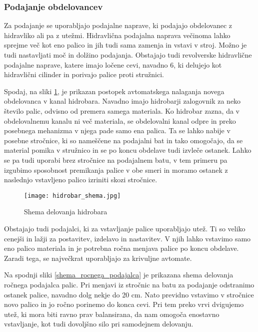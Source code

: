 \subsubsection{Podajanje obdelovancev}
Za podajanje se uporabljajo podajalne naprave, ki podajajo
obdelovanec z hidravliko ali pa z utežmi. Hidravlična podajalna
naprava večinoma lahko sprejme več kot eno palico in jih tudi sama
zamenja in vstavi v stroj. Možno je tudi nastavljati moč in dolžino
podajanja. Obstajajo tudi revolverske hidravlične podajalne naprave,
katere imajo ločene cevi, navadno 6, ki delujejo kot hidravlični cilinder
in porivajo palice proti stružnici.

Spodaj, na sliki \ref{hidrobar_nalaganje}, je prikazan postopek
avtomatskega nalaganja novega obdelovanca v kanal hidrobara.
Navadno imajo hidrobarji zalogovnik za neko število palic, odvisno
od premera samega materiala. Ko hidrobar zazna, da v obdelovalnemu
kanalu ni več materiala, se obdelovalni kanal odpre in preko posebnega
mehanizma v njega pade samo ena palica. Ta se lahko nabije v posebne
stročnice, ki so nameščene na podajalni bat in tako omogočajo, da se
material pomika v stružnico in se po koncu obdelave tudi izvleče ostanek.
Lahko se pa tudi uporabi brez stročnice na podajalnem batu, v tem primeru
pa izgubimo sposobnost premikanja palice v obe smeri in moramo ostanek z
naslednjo vstavljeno palico izriniti skozi stročnice.
\begin{figure}[H]
	\begin{center}
		\texttt{[image: hidrobar\_shema.jpg]}
		\caption{Shema delovanja hidrobara
			\cite{interna}}
		\label{hidrobar_nalaganje}
	\end{center}
\end{figure}



Obstajajo tudi podajalci, ki za vstavljanje palice uporabljajo
utež. Ti so veliko cenejši in lažji za postavitev, izdelavo in nastavitev.
V njih lahko vstavimo samo eno palico materiala in je potrebna ročna menjava
palice po koncu obdelave. Zaradi tega, se največkrat uporabljajo za
krivuljne avtomate.

Na spodnji sliki \ref{shema_rocnega_podajalca} je prikazana shema
delovanja ročnega podajalca palic. Pri menjavi iz stročnic na batu za podajanje
odstranimo ostanek palice, navadno dolg nekje do 20 cm. Nato previdno
vstavimo v stročnice novo palico in jo ročno porinemo do konca cevi.
Pri tem preko vrvi dvigujemo utež, ki mora biti ravno prav balansirana,
da nam omogoča enostavno vstavljanje, kot tudi dovoljšno silo pri samodejnem
delovanju.

